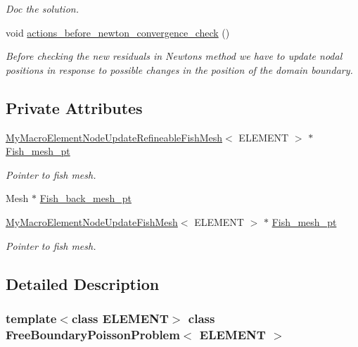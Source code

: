 \begin{DoxyCompactItemize}
\begin{DoxyCompactList}\small\item\em Doc the solution. \end{DoxyCompactList}\item 
void \hyperlink{classFreeBoundaryPoissonProblem_a885a6e3a4efd1f02314806dced566569}{actions\+\_\+before\+\_\+newton\+\_\+convergence\+\_\+check} ()
\begin{DoxyCompactList}\small\item\em Before checking the new residuals in Newton\textquotesingle{}s method we have to update nodal positions in response to possible changes in the position of the domain boundary. \end{DoxyCompactList}\end{DoxyCompactItemize}
\subsection*{Private Attributes}
\begin{DoxyCompactItemize}
\item 
\hyperlink{classMyMacroElementNodeUpdateRefineableFishMesh}{My\+Macro\+Element\+Node\+Update\+Refineable\+Fish\+Mesh}$<$ E\+L\+E\+M\+E\+NT $>$ $\ast$ \hyperlink{classFreeBoundaryPoissonProblem_ae81a7e22c2c61854696b80a94053a663}{Fish\+\_\+mesh\+\_\+pt}
\begin{DoxyCompactList}\small\item\em Pointer to fish mesh. \end{DoxyCompactList}\item 
Mesh $\ast$ \hyperlink{classFreeBoundaryPoissonProblem_aaa45902e79f963060b4b6820c5383cfc}{Fish\+\_\+back\+\_\+mesh\+\_\+pt}
\item 
\hyperlink{classMyMacroElementNodeUpdateFishMesh}{My\+Macro\+Element\+Node\+Update\+Fish\+Mesh}$<$ E\+L\+E\+M\+E\+NT $>$ $\ast$ \hyperlink{classFreeBoundaryPoissonProblem_a625f90221f74269b3ebc8ea6d0035feb}{Fish\+\_\+mesh\+\_\+pt}
\begin{DoxyCompactList}\small\item\em Pointer to fish mesh. \end{DoxyCompactList}\end{DoxyCompactItemize}


\subsection{Detailed Description}
\subsubsection*{template$<$class E\+L\+E\+M\+E\+NT$>$\newline
class Free\+Boundary\+Poisson\+Problem$<$ E\+L\+E\+M\+E\+N\+T $>$}


